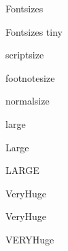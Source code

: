 \documentclass[final,hyperref={pdfpagelabels=false}]{beamer}
\begin{document}
\begin{frame}{}
\begin{block}{\large Fontsizes}
    \end{block}
 
    \vfill
    
    \begin{block}{\large Fontsizes}
      \centering
      {\tiny tiny}\par
      {\scriptsize scriptsize}\par
      {\footnotesize footnotesize}\par
      {\normalsize normalsize}\par
      {\large large}\par
      {\Large Large}\par
      {\LARGE LARGE}\par
      {\veryHuge VeryHuge}\par
      {\VeryHuge VeryHuge}\par
      {\VERYHuge VERYHuge}\par
    \end{block}
        
    
\end{frame}
\end{document}
